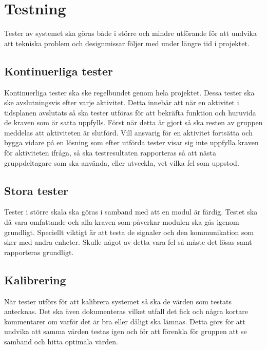 \section{Testning}
Tester av systemet ska göras både i större och mindre utförande för att undvika att tekniska problem och designmissar följer med under längre tid i projektet.

\subsection{Kontinuerliga tester}
Kontinuerliga tester ska ske regelbundet genom hela projektet. Dessa tester ska ske avslutningsvis efter varje aktivitet. Detta innebär att när en aktivitet i tidsplanen avslutats så ska tester utföras för att bekräfta funktion och huruvida de kraven som är satta uppfylls. Först när detta är gjort så ska resten av gruppen meddelas att aktiviteten är slutförd. Vill ansvarig för en aktivitet fortsätta och bygga vidare på en lösning som efter utförda tester visar sig inte uppfylla kraven för aktiviteten ifråga, så ska testresultaten rapporteras så att nästa gruppdeltagare som ska använda, eller utveckla, vet vilka fel som uppstod.

\subsection{Stora tester}
Tester i större skala ska göras i samband med att en modul är färdig. Testet ska då vara omfattande och alla kraven som påverkar modulen ska gås igenom grundligt. Speciellt viktigt är att testa de signaler och den kommunikation som sker med andra enheter. Skulle något av detta vara fel så måste det lösas samt rapporteras grundligt.

\subsection{Kalibrering}
När tester utförs för att kalibrera systemet så ska de värden som testats antecknas. Det ska även dokumenteras vilket utfall det fick och några kortare kommentarer om varför det är bra eller dåligt ska lämnas. Detta görs för att undvika att samma värden testas igen och för att förenkla för gruppen att se samband och hitta optimala värden.
